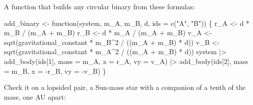\documentclass[
  10.5pt,
  letterpaper,
]{scrbook}
\newenvironment{Shaded}{\begin{snugshade}}{\end{snugshade}}
\newcommand{\AttributeTok}[1]{\textcolor[rgb]{0.00,0.00,0.00}{#1}}
\newcommand{\ControlFlowTok}[1]{\textcolor[rgb]{0.00,0.00,0.00}{#1}}
\newcommand{\DecValTok}[1]{\textcolor[rgb]{0.00,0.00,0.00}{#1}}
\newcommand{\FunctionTok}[1]{\textcolor[rgb]{0.00,0.00,0.00}{#1}}
\newcommand{\NormalTok}[1]{\textcolor[rgb]{0.00,0.00,0.00}{#1}}
\newcommand{\OtherTok}[1]{\textcolor[rgb]{0.00,0.00,0.00}{#1}}
\newcommand{\SpecialCharTok}[1]{\textcolor[rgb]{0.00,0.00,0.00}{#1}}
\newcommand{\StringTok}[1]{\textcolor[rgb]{0.00,0.00,0.00}{#1}}
\theoremstyle{plain}
\theoremstyle{remark}
\begin{document}
A function that builds any circular binary from these formulas:

\begin{Shaded}
\begin{Highlighting}[]
\NormalTok{add\_binary }\OtherTok{\textless{}{-}} \ControlFlowTok{function}\NormalTok{(system, m\_A, m\_B, d, }\AttributeTok{ids =} \FunctionTok{c}\NormalTok{(}\StringTok{"A"}\NormalTok{, }\StringTok{"B"}\NormalTok{)) \{}
\NormalTok{  r\_A }\OtherTok{\textless{}{-}}\NormalTok{ d }\SpecialCharTok{*}\NormalTok{ m\_B }\SpecialCharTok{/}\NormalTok{ (m\_A }\SpecialCharTok{+}\NormalTok{ m\_B)}
\NormalTok{  r\_B }\OtherTok{\textless{}{-}}\NormalTok{ d }\SpecialCharTok{*}\NormalTok{ m\_A }\SpecialCharTok{/}\NormalTok{ (m\_A }\SpecialCharTok{+}\NormalTok{ m\_B)}
\NormalTok{  v\_A }\OtherTok{\textless{}{-}} \FunctionTok{sqrt}\NormalTok{(gravitational\_constant }\SpecialCharTok{*}\NormalTok{ m\_B}\SpecialCharTok{\^{}}\DecValTok{2} \SpecialCharTok{/}\NormalTok{ ((m\_A }\SpecialCharTok{+}\NormalTok{ m\_B) }\SpecialCharTok{*}\NormalTok{ d))}
\NormalTok{  v\_B }\OtherTok{\textless{}{-}} \FunctionTok{sqrt}\NormalTok{(gravitational\_constant }\SpecialCharTok{*}\NormalTok{ m\_A}\SpecialCharTok{\^{}}\DecValTok{2} \SpecialCharTok{/}\NormalTok{ ((m\_A }\SpecialCharTok{+}\NormalTok{ m\_B) }\SpecialCharTok{*}\NormalTok{ d))}
\NormalTok{  system }\SpecialCharTok{|\textgreater{}}
    \FunctionTok{add\_body}\NormalTok{(ids[}\DecValTok{1}\NormalTok{], }\AttributeTok{mass =}\NormalTok{ m\_A, }\AttributeTok{x =}\NormalTok{  r\_A, }\AttributeTok{vy =}\NormalTok{  v\_A) }\SpecialCharTok{|\textgreater{}}
    \FunctionTok{add\_body}\NormalTok{(ids[}\DecValTok{2}\NormalTok{], }\AttributeTok{mass =}\NormalTok{ m\_B, }\AttributeTok{x =} \SpecialCharTok{{-}}\NormalTok{r\_B, }\AttributeTok{vy =} \SpecialCharTok{{-}}\NormalTok{v\_B)}
\NormalTok{\}}
\end{Highlighting}
\end{Shaded}

Check it on a lopsided pair, a Sun-mass star with a companion of a tenth
of the mass, one AU apart:
\end{document}

